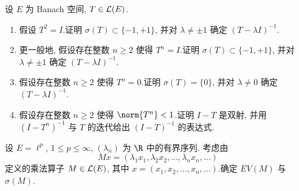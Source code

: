 \begin{exercise}
\label{exer:6.16}
设 $E$ 为 Banach 空间, $T\in\mathcal{L}(E)$.
\begin{enumerate}[label=\arabic*., leftmargin=2.2em, itemsep=0.3em]
	\item 假设 $T^2=I$.证明 $\sigma(T)\subset\{-1,+1\}$, 并对
	      $\lambda\ne\pm1$ 确定 $(T-\lambda I)^{-1}$.
	\item 更一般地, 假设存在整数 $n\ge2$ 使得 $T^n=I$.证明
	      $\sigma(T)\subset\{-1,+1\}$, 并对 $\lambda\ne\pm1$ 确定
	      $(T-\lambda I)^{-1}$.
	\item 假设存在整数 $n\ge2$ 使得 $T^n=0$.证明 $\sigma(T)=\{0\}$, 并对
	      $\lambda\ne0$ 确定 $(T-\lambda I)^{-1}$.
	\item 假设存在整数 $n\ge2$ 使得 $\norm{T^n}<1$.证明 $I-T$ 是双射, 并用
	      $(I-T^n)^{-1}$ 与 $T$ 的迭代给出 $(I-T)^{-1}$ 的表达式.
\end{enumerate}
\end{exercise}

\begin{exercise}
\label{exer:6.17}
设 $E=\ell^p$, $1\le p\le\infty$, $(\lambda_n)$ 为 $\R$ 中的有界序列.
考虑由
\begin{equation*}
Mx=(\lambda_1x_1,\lambda_2x_2,\dots,\lambda_nx_n,\dots)
\end{equation*}
定义的乘法算子 $M\in\mathcal{L}(E)$, 其中 $x=(x_1,x_2,\dots,x_n,\dots)$.确定
$EV(M)$ 与 $\sigma(M)$.
\end{exercise}

